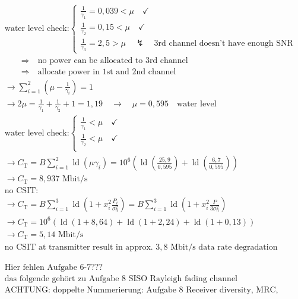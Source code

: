 \documentclass[fleqn]{article}
\DeclareMathOperator{\ld}{ld}
\begin{document}
\begin{align*}
	&\text{water level check:}
	\begin{cases}
	\frac{1}{\gamma_{1}}=0,039<\mu\quad\checkmark \\
	\frac{1}{\gamma_{2}}=0,15<\mu\quad\checkmark \\
	\frac{1}{\gamma_{3}}=2,5>\mu \quad\lightning\quad\text{3rd channel doesn't have enough SNR}
	\end{cases}& \\
	&\qquad\Rightarrow\quad\text{no power can be allocated to 3rd channel}& \\
	&\qquad\Rightarrow\quad\text{allocate power in 1st and 2nd channel}& \\
	&\rightarrow\sum_{i=1}^{2}\left(\mu-\frac{1}{\gamma_{i}}\right)=1& \\
	&\rightarrow 2\mu=\frac{1}{\gamma_{1}}+\frac{1}{\gamma_{2}}+1=1,19\quad\rightarrow\quad\mu=0,595\quad\text{water level}& \\
	&\text{water level check:}
	\begin{cases}
	\frac{1}{\gamma_{1}}<\mu\quad\checkmark \\
	\frac{1}{\gamma_{2}}<\mu\quad\checkmark \\
	\end{cases}& \\
	&\rightarrow C_{\mathrm{T}}=B\sum_{i=1}^{2}\ld\left(\mu\gamma_{i}\right)=10^{6}\left(\ld\left(\frac{25,9}{0,595}\right)+\ld\left(\frac{6,7}{0,595}\right)\right)& \\
	&\rightarrow C_{\mathrm{T}}=8,937\text{ Mbit/s}& \\
	&\text{no CSIT: }& \\
	&\rightarrow C_{\mathrm{T}}=B\sum_{i=1}^{3}\ld\left(1+x_{i}^{2}\frac{P_{i}}{\sigma_{n}^{2}}\right)=B\sum_{i=1}^{3}\ld\left(1+x_{i}^{2}\frac{P}{3\sigma_{n}^{2}}\right)& \\
	&\rightarrow C_{\mathrm{T}}=10^{6}\left(\ld\left(1+8,64\right)+\ld\left(1+2,24\right)+\ld\left(1+0,13\right)\right)& \\
	&\rightarrow C_{\mathrm{T}}=5,14\text{ Mbit/s}& \\
	&\text{no CSIT at transmitter result in approx. $3,8$ Mbit/s data rate degradation}&
\end{align*}

\begin{align*}
&\text{Hier fehlen Aufgabe 6-7???}& \\
&\text{das folgende gehört zu Aufgabe 8 SISO Rayleigh fading channel}& \\
&\text{ACHTUNG: doppelte Nummerierung: Aufgabe 8 Receiver diversity, MRC, EGC and SC}&
\end{align*}
\end{document}
